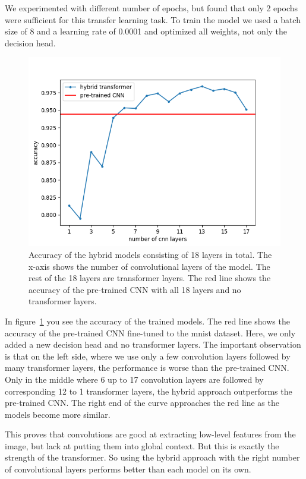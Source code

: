 \documentclass[a4paper]{scrartcl}
\begin{document}
    We experimented with different number of epochs, but found that only 2 epochs were sufficient for this transfer learning task.
    To train the model we used a batch size of 8 and a learning rate of 0.0001 and optimized all weights, not only the decision head.

    \begin{figure}[btp]
        \centering
        \includegraphics[width=0.8\linewidth]{img/plots/hybrid_transformer}
        \caption[Accuracy of hybrid approaches]{Accuracy of the hybrid models consisting of 18 layers in total.
        The x-axis shows the number of convolutional layers of the model.
        The rest of the 18 layers are transformer layers.
        The red line shows the accuracy of the pre-trained CNN with all 18 layers and no transformer layers.
        }
        \label{fig:hybrid-accuracy}
    \end{figure}

    In figure~\ref{fig:hybrid-accuracy} you see the accuracy of the trained models.
    The red line shows the accuracy of the pre-trained CNN fine-tuned to the mnist dataset.
    Here, we only added a new decision head and no transformer layers.
    The important observation is that on the left side, where we use only a few convolution layers followed by many transformer layers, the performance is worse than the pre-trained CNN\@.
    Only in the middle where 6 up to 17 convolution layers are followed by corresponding 12 to 1 transformer layers, the hybrid approach outperforms the pre-trained CNN\@.
    The right end of the curve approaches the red line as the models become more similar.

    This proves that convolutions are good at extracting low-level features from the image, but lack at putting them into global context.
    But this is exactly the strength of the transformer.
    So using the hybrid approach with the right number of convolutional layers performs better than each model on its own.
\end{document}
